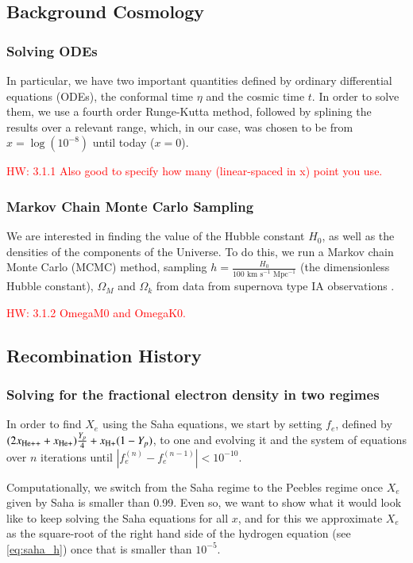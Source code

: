 \documentclass{aa}
\newcommand{\hw}[1]{\textcolor{red}{HW: #1}}
\begin{document}
\subsection{Background Cosmology}

\subsubsection{Solving ODEs}

In particular, we have two important quantities defined by ordinary differential equations (ODEs), the conformal time $\eta$ and the cosmic time $t$. In order to solve them, we use a fourth order Runge-Kutta method, followed by splining the results over a relevant range, which, in our case, was chosen to be from $x=\log(10^{-8})$ until today ($x=0$).

\hw{3.1.1 Also good to specify how many (linear-spaced in x) point you use.}

\subsubsection{Markov Chain Monte Carlo Sampling}

We are interested in finding the value of the Hubble constant $H_0$, as well as the densities of the components of the Universe. To do this, we run a Markov chain Monte Carlo (MCMC) method, sampling $h = \frac{H_0}{100\text{ km s}^{-1}\text{ Mpc}^{-1}}$ (the dimensionless Hubble constant), $\Omega_M$ and $\Omega_k$ from data from supernova type IA observations \citep{Betoule_2014}.

\hw{3.1.2 OmegaM0 and OmegaK0.}

\subsection{Recombination History}

\subsubsection{Solving for the fractional electron density in two regimes}

In order to find $X_e$ using the Saha equations, we start by setting $f_e$, defined by $(2x_{\rm He++} + x_{\rm He+})\frac{Y_p}{4} + x_{\rm H+}(1-Y_p)$, to one and evolving it and the system of equations over $n$ iterations until $|f_e^{(n)} - f_e^{(n-1)}| < 10^{-10}$.

Computationally, we switch from the Saha regime to the Peebles regime once $X_e$ given by Saha is smaller than 0.99. Even so, we want to show what it would look like to keep solving the Saha equations for all $x$, and for this we approximate $X_e$ as the square-root of the right hand side of the hydrogen equation (see \eqref{eq:saha_h}) once that is smaller than $10^{-5}$.
\end{document}
